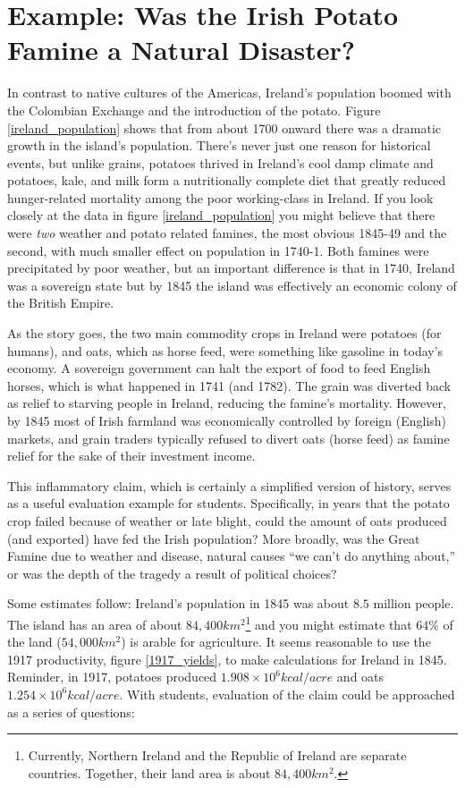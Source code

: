 \documentclass[jou]{apa7}
\begin{document}
\section{Example: Was the Irish Potato Famine a Natural Disaster?}
In contrast to native cultures of the Americas, Ireland's population boomed with the Colombian Exchange and the introduction of the potato.\cite{potato,little_ice_age}  Figure \ref{ireland_population} shows that from about 1700 onward there was a dramatic growth in the island's population.  There's never just one reason for historical events, but unlike grains, potatoes thrived in Ireland's cool damp climate and potatoes, kale, and milk form a nutritionally complete diet that greatly reduced hunger-related mortality among the poor working-class in Ireland.  If you look closely at the data in figure \ref{ireland_population} you might believe that there were \textit{two} weather and potato related famines, the most obvious 1845-49 and the second, with much smaller effect on population in 1740-1.  Both famines were precipitated by poor weather, but an important difference is that in 1740, Ireland was a sovereign state but by 1845 the island was effectively an economic colony of the British Empire.\cite{little_ice_age}  

As the story goes, the two main commodity crops in Ireland were potatoes (for humans), and oats, which as horse feed, were something like gasoline in today's economy.  A sovereign government can halt the export of food to feed English horses, which is what happened in 1741 (and 1782). The grain was diverted back as relief to starving people in Ireland, reducing the famine's mortality. However, by 1845 most of Irish farmland was economically controlled by foreign (English) markets, and grain traders typically refused to divert oats (horse feed) as famine relief for the sake of their investment income.

This inflammatory claim, which is certainly a simplified version of history, serves as a useful evaluation example for students. Specifically, in years that the potato crop failed because of weather or late blight, could the amount of oats produced (and exported) have fed the Irish population?  More broadly, was the Great Famine due to weather and disease, natural causes ``we can't do anything about,''  or was the depth of the tragedy a result of political choices?

Some estimates follow:  Ireland's population in 1845 was about $8.5$ million people.  The island has an area of about $84,400km^2$\footnote{
Currently, Northern Ireland and the Republic of Ireland are separate countries.  Together, their land area is about $84,400km^2$.}
and you might estimate that $64\%$ of the land ($54,000km^2$) is arable for agriculture.\cite{arable_percentage}  
It seems reasonable to use the 1917 productivity,  figure \ref{1917_yields},  to make calculations for Ireland in 1845.  Reminder, in 1917, potatoes produced $1.908\times10^6 kcal/acre$ and oats $1.254\times10^6kcal/acre$.
With students, evaluation of the claim could be approached as a series of questions:
\end{document}
